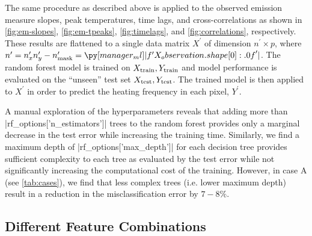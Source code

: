The same procedure as described above is applied to the observed emission measure slopes, peak temperatures, time lags, and cross-correlations as shown in \autoref{fig:em-slopes}, \autoref{fig:em-tpeaks}, \autoref{fig:timelags}, and \autoref{fig:correlations}, respectively.
These results are flattened to a single data matrix $X^\prime$ of dimension $n^\prime\times p$, where $n^\prime=n_x^\prime n_y^\prime - n^\prime_\textup{mask}=\py[manager_ml]|f'{X_observation.shape[0]:.0f}'|$.
The random forest model is trained on $X_\textup{train},Y_\textup{train}$ and model performance is evaluated on the ``unseen'' test set $X_\textup{test},Y_\textup{test}$.
The trained model is then applied to $X^\prime$ in order to predict the heating frequency in each pixel, $Y^\prime$.

A manual exploration of the hyperparameters reveals that adding more than \py[manager_ml]|rf_options['n_estimators']| trees to the random forest provides only a marginal decrease in the test error while increasing the training time.
Similarly, we find a maximum depth of \py[manager_ml]|rf_options['max_depth']| for each decision tree provides sufficient complexity to each tree as evaluated by the test error while not significantly increasing the computational cost of the training.
However, in case A (see \autoref{tab:cases}), we find that less complex trees (i.e. lower maximum depth) result in a reduction in the misclassification error by $7-8\%$.

\subsection{Different Feature Combinations}\label{sec:feature-combos}


